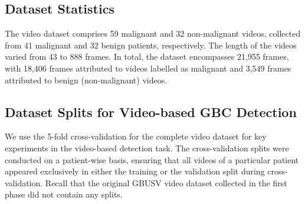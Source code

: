 \subsection{Dataset Statistics}
%
The video dataset comprises 59 malignant and 32 non-malignant videos, collected from 41 malignant and 32 benign patients, respectively. The length of the videos varied from 43 to 888 frames. In total, the dataset encompasses 21,955 frames, with 18,406 frames attributed to videos labelled as malignant and 3,549 frames attributed to benign (non-malignant) videos. %

\subsection{Dataset Splits for Video-based GBC Detection}
%
We use the 5-fold cross-validation for the complete video dataset for key experiments in the video-based detection task. The cross-validation splits were conducted on a patient-wise basis, ensuring that all videos of a particular patient appeared exclusively in either the training or the validation split during cross-validation. Recall that the original GBUSV video dataset collected in the first phase did not contain any splits.